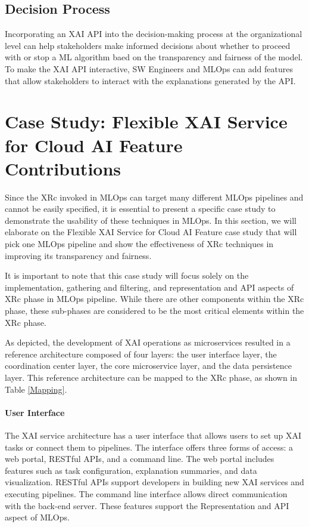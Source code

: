 \documentclass[conference]{IEEEtran}
\begin{document}
\subsection{Decision Process}
Incorporating an XAI API into the decision-making process at the organizational level can help stakeholders make informed decisions about whether to proceed with or stop a ML algorithm baed on the transparency and fairness of the model. To make the XAI API interactive, SW Engineers and MLOps can add features that allow stakeholders to interact with the explanations generated by the API.
\section{Case Study: Flexible XAI Service for Cloud AI Feature Contributions}
Since the XRc invoked in MLOps can target many different MLOps pipelines and cannot be easily specified, it is essential to present a specific case study to demonstrate the usability of these techniques in MLOps. In this section, we will elaborate on the Flexible XAI Service for Cloud AI Feature case study that will pick one MLOps pipeline and show the effectiveness of XRc techniques in improving its transparency and fairness.

It is important to note that this case study will focus solely on the implementation, gathering and filtering, and representation and API aspects of XRc phase in MLOps pipeline. While there are other components within the XRc phase, these sub-phases are considered to be the most critical elements within the XRc phase.

As depicted, the development of XAI operations as microservices resulted in a reference architecture composed of four layers: the user interface layer, the coordination center layer, the core microservice layer, and the data persistence layer. This reference architecture can be mapped to the XRc phase, as shown in Table \ref{Mapping}.
\paragraph{User Interface} The XAI service architecture has a user interface that allows users to set up XAI tasks or connect them to pipelines. The interface offers three forms of access: a web portal, RESTful APIs, and a command line. The web portal includes features such as task configuration, explanation summaries, and data visualization. RESTful APIs support developers in building new XAI services and executing pipelines. The command line interface allows direct communication with the back-end server. These features support the Representation and API aspect of MLOps.
\end{document}
